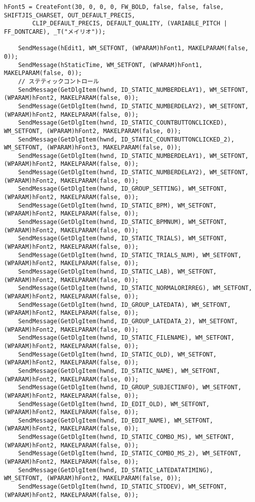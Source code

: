 \begin{lstlisting}[caption=main.cpp]
	hFont5 = CreateFont(30, 0, 0, 0, FW_BOLD, false, false, false, SHIFTJIS_CHARSET, OUT_DEFAULT_PRECIS,
		CLIP_DEFAULT_PRECIS, DEFAULT_QUALITY, (VARIABLE_PITCH | FF_DONTCARE), _T("メイリオ"));

	SendMessage(hEdit1, WM_SETFONT, (WPARAM)hFont1, MAKELPARAM(false, 0));
	SendMessage(hStaticTime, WM_SETFONT, (WPARAM)hFont1, MAKELPARAM(false, 0));
	// ステティックコントロール
	SendMessage(GetDlgItem(hwnd, ID_STATIC_NUMBERDELAY1), WM_SETFONT, (WPARAM)hFont2, MAKELPARAM(false, 0));
	SendMessage(GetDlgItem(hwnd, ID_STATIC_NUMBERDELAY2), WM_SETFONT, (WPARAM)hFont2, MAKELPARAM(false, 0));
	SendMessage(GetDlgItem(hwnd, ID_STATIC_COUNTBUTTONCLICKED), WM_SETFONT, (WPARAM)hFont2, MAKELPARAM(false, 0));
	SendMessage(GetDlgItem(hwnd, ID_STATIC_COUNTBUTTONCLICKED_2), WM_SETFONT, (WPARAM)hFont3, MAKELPARAM(false, 0));
	SendMessage(GetDlgItem(hwnd, ID_STATIC_NUMBERDELAY1), WM_SETFONT, (WPARAM)hFont2, MAKELPARAM(false, 0));
	SendMessage(GetDlgItem(hwnd, ID_STATIC_NUMBERDELAY2), WM_SETFONT, (WPARAM)hFont2, MAKELPARAM(false, 0));
	SendMessage(GetDlgItem(hwnd, ID_GROUP_SETTING), WM_SETFONT, (WPARAM)hFont2, MAKELPARAM(false, 0));
	SendMessage(GetDlgItem(hwnd, ID_STATIC_BPM), WM_SETFONT, (WPARAM)hFont2, MAKELPARAM(false, 0));
	SendMessage(GetDlgItem(hwnd, ID_STATIC_BPMNUM), WM_SETFONT, (WPARAM)hFont2, MAKELPARAM(false, 0));
	SendMessage(GetDlgItem(hwnd, ID_STATIC_TRIALS), WM_SETFONT, (WPARAM)hFont2, MAKELPARAM(false, 0));
	SendMessage(GetDlgItem(hwnd, ID_STATIC_TRIALS_NUM), WM_SETFONT, (WPARAM)hFont2, MAKELPARAM(false, 0));
	SendMessage(GetDlgItem(hwnd, ID_STATIC_LAB), WM_SETFONT, (WPARAM)hFont2, MAKELPARAM(false, 0));
	SendMessage(GetDlgItem(hwnd, ID_STATIC_NORMALORIRREG), WM_SETFONT, (WPARAM)hFont2, MAKELPARAM(false, 0));
	SendMessage(GetDlgItem(hwnd, ID_GROUP_LATEDATA), WM_SETFONT, (WPARAM)hFont2, MAKELPARAM(false, 0));
	SendMessage(GetDlgItem(hwnd, ID_GROUP_LATEDATA_2), WM_SETFONT, (WPARAM)hFont2, MAKELPARAM(false, 0));
	SendMessage(GetDlgItem(hwnd, ID_STATIC_FILENAME), WM_SETFONT, (WPARAM)hFont2, MAKELPARAM(false, 0));
	SendMessage(GetDlgItem(hwnd, ID_STATIC_OLD), WM_SETFONT, (WPARAM)hFont2, MAKELPARAM(false, 0));
	SendMessage(GetDlgItem(hwnd, ID_STATIC_NAME), WM_SETFONT, (WPARAM)hFont2, MAKELPARAM(false, 0));
	SendMessage(GetDlgItem(hwnd, ID_GROUP_SUBJECTINFO), WM_SETFONT, (WPARAM)hFont2, MAKELPARAM(false, 0));
	SendMessage(GetDlgItem(hwnd, ID_EDIT_OLD), WM_SETFONT, (WPARAM)hFont2, MAKELPARAM(false, 0));
	SendMessage(GetDlgItem(hwnd, ID_EDIT_NAME), WM_SETFONT, (WPARAM)hFont2, MAKELPARAM(false, 0));
	SendMessage(GetDlgItem(hwnd, ID_STATIC_COMBO_MS), WM_SETFONT, (WPARAM)hFont2, MAKELPARAM(false, 0));
	SendMessage(GetDlgItem(hwnd, ID_STATIC_COMBO_MS_2), WM_SETFONT, (WPARAM)hFont2, MAKELPARAM(false, 0));
	SendMessage(GetDlgItem(hwnd, ID_STATIC_LATEDATATIMING), WM_SETFONT, (WPARAM)hFont2, MAKELPARAM(false, 0));
	SendMessage(GetDlgItem(hwnd, ID_STATIC_STDDEV), WM_SETFONT, (WPARAM)hFont2, MAKELPARAM(false, 0));


\end{lstlisting}
